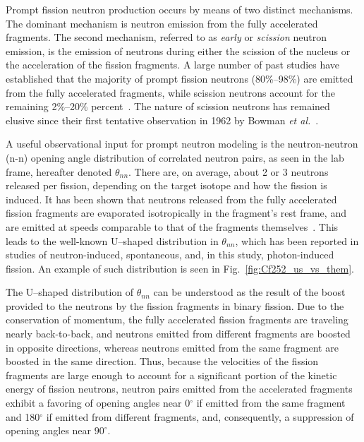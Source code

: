 \documentclass[%
 reprint,
 calc,
 amsmath,amssymb,
 aps,
 nofootinbib,
 linenumbers
]{revtex4-1}
\begin{document}
Prompt fission neutron production occurs by means of two distinct mechanisms.
The dominant mechanism is neutron emission from the fully accelerated fragments.
The second mechanism, referred to as \textit{early} or \textit{scission} neutron emission, is the emission of neutrons during either the scission of the nucleus or the acceleration of the fission fragments.
A large number of past studies have established that the majority of prompt fission neutrons (80\%--98\%) are emitted from the fully accelerated fragments, while scission neutrons account for the remaining 2\%--20\% percent~\cite{Scission2005}.
The nature of scission neutrons has remained elusive since their first tentative observation in 1962 by Bowman \emph{et al.}~\cite{Bowman}.

A useful observational input for prompt neutron modeling is the neutron-neutron (n-n) opening angle distribution of correlated neutron pairs, as seen in the lab frame, hereafter denoted $\theta_{nn}$.
There are, on average, about 2 or 3 neutrons released per fission, depending on the target isotope and how the fission is induced.
It has been shown that neutrons released from the fully accelerated fission fragments are evaporated isotropically in the fragment's rest frame, and are emitted at speeds comparable to that of the fragments themselves~\cite{JORGENSEN}.
This leads to the well-known U--shaped distribution in $\theta_{nn}$, which has been reported in studies of neutron-induced, spontaneous, and, in this study, photon-induced fission.
An example of such distribution is seen in Fig.~\ref{fig:Cf252_us_vs_them}.

The U--shaped distribution of $\theta_{nn}$ can be understood as the result of the boost provided to the neutrons by the fission fragments in binary fission.
Due to the conservation of momentum, the fully accelerated fission fragments are traveling nearly back-to-back, and neutrons emitted from different fragments are boosted in opposite directions, whereas neutrons emitted from the same fragment are boosted in the same direction.
Thus, because the velocities of the fission fragments are large enough to account for a significant portion of the kinetic energy of fission neutrons, neutron pairs emitted from the accelerated fragments exhibit a favoring of opening angles near 0$^{\circ}$ if emitted from the same fragment and 180$^{\circ}$ if emitted from different fragments, and, consequently, a suppression of opening angles near $90^{\circ}$.
\end{document}
